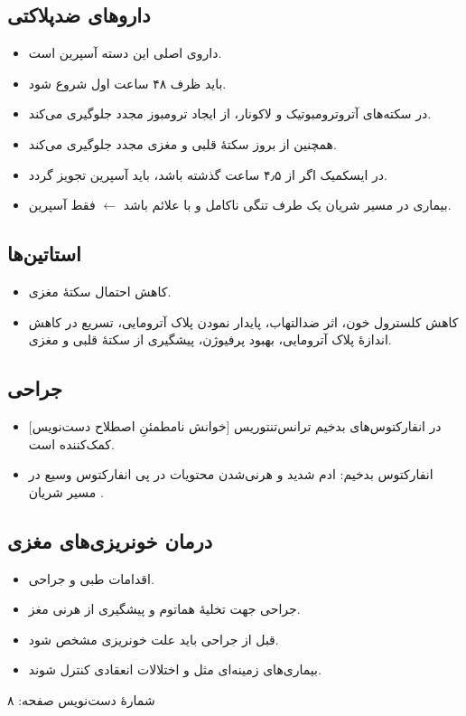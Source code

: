 \documentclass[11pt,a4paper]{article}
\providecommand{\en}[1]{\lr{#1}}
\newcommand{\vbarrow}{\ensuremath{\leftarrow}}
\begin{document}
\subsection*{داروهای ضدپلاکتی}
\begin{itemize}
\item داروی اصلی این دسته آسپرین است.
\item باید ظرف ۴۸ ساعت اول \en{Stroke} شروع شود.
\item در سکته‌های آتروترومبوتیک و لاکونار، از ایجاد ترومبوز مجدد جلوگیری می‌کند.
\item همچنین از بروز سکتهٔ قلبی و مغزی مجدد جلوگیری می‌کند.
\item در \en{Stroke} ایسکمیک اگر از ۴٫۵ ساعت گذشته باشد، باید آسپرین تجویز گردد.
\item بیماری در مسیر شریان یک طرف تنگی ناکامل و با علائم باشد \vbarrow{} فقط آسپرین.
\end{itemize}

\subsection*{استاتین‌ها}
\begin{itemize}
\item کاهش احتمال سکتهٔ مغزی.
\item کاهش کلسترول خون، اثر ضدالتهاب، پایدار نمودن پلاک آترومایی، تسریع در کاهش اندازهٔ پلاک آترومایی، بهبود پرفیوژن، پیشگیری از سکتهٔ قلبی و مغزی.
\end{itemize}
\subsection*{جراحی}
\begin{itemize}
\item در انفارکتوس‌های بدخیم ترانس‌تنتوریس [خوانش نامطمئنِ اصطلاح دست‌نویس] کمک‌کننده است.
\item انفارکتوس بدخیم: ادم شدید و هرنی‌شدن محتویات در پی انفارکتوس وسیع در مسیر شریان \en{MCA}.
\end{itemize}

\subsection*{درمان خونریزی‌های مغزی}
\begin{itemize}
\item اقدامات طبی و جراحی.
\item جراحی جهت تخلیهٔ هماتوم و پیشگیری از هرنی مغز.
\item قبل از جراحی باید علت خونریزی مشخص شود.
\item بیماری‌های زمینه‌ای مثل \en{HTN} و اختلالات انعقادی کنترل شوند.
\end{itemize}
\par\hfill{\footnotesize شمارهٔ دست‌نویس صفحه: ۸}
\end{document}
